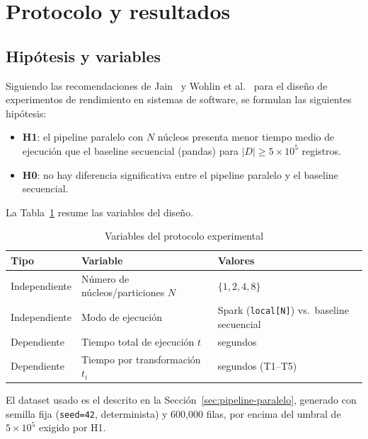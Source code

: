 \section{Protocolo y resultados}
\label{sec:protocolo-resultados}

\subsection{Hipótesis y variables}

Siguiendo las recomendaciones de Jain~\cite{jain1991art} y Wohlin et al.~\cite{wohlin2012experimentation}
para el diseño de experimentos de rendimiento en sistemas de software, se formulan las siguientes
hipótesis:

\begin{itemize}[leftmargin=1.5em]
    \item \textbf{H1}: el pipeline paralelo con $N$ núcleos presenta menor tiempo medio de
        ejecución que el baseline secuencial (pandas) para $|D| \geq 5 \times 10^5$ registros.
    \item \textbf{H0}: no hay diferencia significativa entre el pipeline paralelo y el baseline
        secuencial.
\end{itemize}

La Tabla~\ref{tab:variables-experimento} resume las variables del diseño.

\begin{table}[H]
\centering
\caption{Variables del protocolo experimental}
\label{tab:variables-experimento}
\begin{tabular}{@{}lll@{}}
\toprule
\textbf{Tipo} & \textbf{Variable} & \textbf{Valores} \\
\midrule
Independiente & Número de núcleos/particiones $N$ & $\{1, 2, 4, 8\}$ \\
Independiente & Modo de ejecución & Spark (\texttt{local[N]}) vs.\ baseline secuencial \\
Dependiente & Tiempo total de ejecución $t$ & segundos \\
Dependiente & Tiempo por transformación $t_i$ & segundos (T1--T5) \\
\bottomrule
\end{tabular}
\end{table}

El dataset usado es el descrito en la Sección~\ref{sec:pipeline-paralelo}, generado con semilla
fija (\texttt{seed=42}, determinista) y 600{,}000 filas, por encima del umbral de $5 \times 10^5$
exigido por H1.

